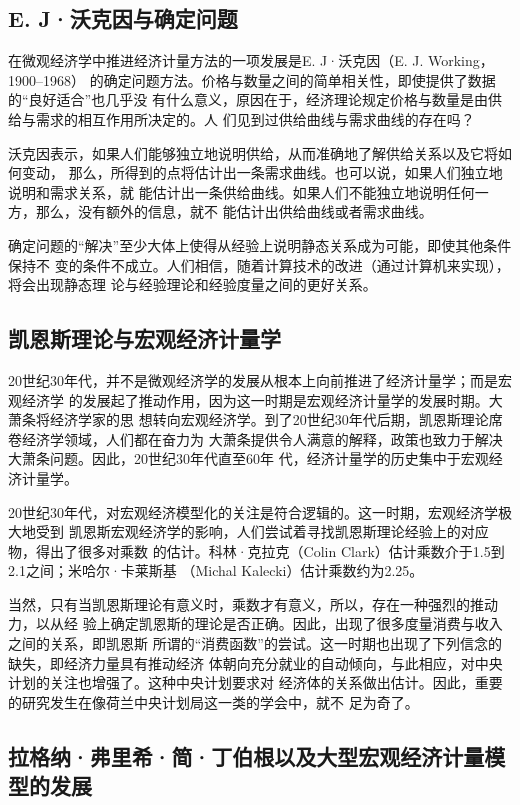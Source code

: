 \subsection{E. J·沃克因与确定问题}

在微观经济学中推进经济计量方法的一项发展是E. J·沃克因（E. J. Working，1900--1968）
的确定问题方法。价格与数量之间的简单相关性，即使提供了数据的“良好适合”也几乎没
有什么意义，原因在于，经济理论规定价格与数量是由供给与需求的相互作用所决定的。人
们见到过供给曲线与需求曲线的存在吗？

沃克因表示，如果人们能够独立地说明供给，从而准确地了解供给关系以及它将如何变动，
那么，所得到的点将估计出一条需求曲线。也可以说，如果人们独立地说明和需求关系，就
能估计出一条供给曲线。如果人们不能独立地说明任何一方，那么，没有额外的信息，就不
能估计出供给曲线或者需求曲线。

确定问题的“解决”至少大体上使得从经验上说明静态关系成为可能，即使其他条件保持不
变的条件不成立。人们相信，随着计算技术的改进（通过计算机来实现），将会出现静态理
论与经验理论和经验度量之间的更好关系。

\subsection{凯恩斯理论与宏观经济计量学}

20世纪30年代，并不是微观经济学的发展从根本上向前推进了经济计量学；而是宏观经济学
的发展起了推动作用，因为这一时期是宏观经济计量学的发展时期。大萧条将经济学家的思
想转向宏观经济学。到了20世纪30年代后期，凯恩斯理论席卷经济学领域，人们都在奋力为
大萧条提供令人满意的解释，政策也致力于解决大萧条问题。因此，20世纪30年代直至60年
代，经济计量学的历史集中于宏观经济计量学。

20世纪30年代，对宏观经济模型化的关注是符合逻辑的。这一时期，宏观经济学极大地受到
凯恩斯宏观经济学的影响，人们尝试着寻找凯恩斯理论经验上的对应物，得出了很多对乘数
的估计。科林·克拉克（Colin Clark）估计乘数介于1.5到2.1之间；米哈尔·卡莱斯基
（Michal Kalecki）估计乘数约为2.25。

当然，只有当凯恩斯理论有意义时，乘数才有意义，所以，存在一种强烈的推动力，以从经
验上确定凯恩斯的理论是否正确。因此，出现了很多度量消费与收入之间的关系，即凯恩斯
所谓的“消费函数”的尝试。这一时期也出现了下列信念的缺失，即经济力量具有推动经济
体朝向充分就业的自动倾向，与此相应，对中央计划的关注也增强了。这种中央计划要求对
经济体的关系做出估计。因此，重要的研究发生在像荷兰中央计划局这一类的学会中，就不
足为奇了。

\subsection{拉格纳·弗里希·简·丁伯根以及大型宏观经济计量模型的发展}

